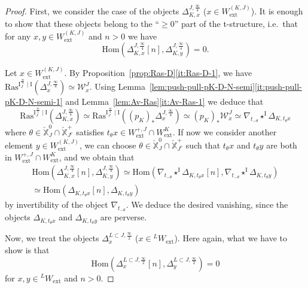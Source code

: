 \documentclass[11pt]{amsart}
\numberwithin{equation}{section}
\theoremstyle{plain}
\theoremstyle{definition}
\newcommand{\I}{{\mathrm I}}
\newcommand{\sW}{{\mathcal W}}
\newcommand{\X}{{\mathbb X}}
\newcommand{\Xd}{\check{\X}}
\newcommand{\Hom}{\mathrm{Hom}}
\newcommand{\semi}{{{\frac{\infty}{2}}}}
\newcommand{\quar}{{{\frac{\infty}{4}}}}
\newcommand{\ex}{\mathrm{ext}}
\newcommand{\Ras}{\mathrm{Ras}}
\newcommand{\comp}{\mathrm{c}}
\begin{document}
\begin{proof}
First, we consider the case of the objects $\Delta^{J,\quar}_{K,x}$ ($x \in W_\ex^{(K,J)}$). It is enough to show that these objects belong to the ``$\geq 0$'' part of the t-structure, i.e.~that for any $x,y\in W_\ex^{(K,J)}$ and $n>0$ we have 
\begin{equation*}
\Hom(\Delta^{J,\quar}_{K,x}[n],\Delta^{J,\quar}_{K,y})=0. 
\end{equation*}

Let $x \in W_\ex^{(K,J)}$.
By Proposition~\ref{prop:Ras-D}\eqref{it:Ras-D-1}, we have $\Ras^{\I_{J}^{\quar}\mid \I}(\Delta^{J,\quar}_{x})\simeq \sW^{J}_{x}$. Using Lemma~\ref{lem:push-pull-pK-D-N-semi}\eqref{it:push-pull-pK-D-N-semi-1} and Lemma~\ref{lem:Av-Ras}\eqref{it:Av-Ras-1} we deduce that
\[
\Ras^{\I_{J}^{\quar}\mid \I}(\Delta^{J,\quar}_{K,x})\simeq \Ras^{\I_{J}^{\quar}\mid \I}((p_K)_* \Delta^{J,\quar}_{x}) \simeq (p_K)_* \sW^{J}_{x} \simeq \nabla_{t_{-\theta}} \star^{\I} \Delta_{K,t_\theta x}
\]
where $\theta \in \Xd_J^0 \cap \Xd_{J^\comp}^+$ satisfies $t_\theta x \in W_\ex^{+,J} \cap W_\ex^{K}$. If now we consider another element $y \in W_\ex^{(K,J)}$, we can choose $\theta \in \Xd_J^0 \cap \Xd_{J^\comp}^+$ such that $t_\theta x$ and $t_\theta y$ are both in $W_\ex^{+,J} \cap W_\ex^{K}$, and we obtain that
\begin{multline*}
\Hom(\Delta^{J,\quar}_{K,x}[n],\Delta^{J,\quar}_{K,y}) \simeq \Hom(\nabla_{t_{-\theta}} \star^{\I} \Delta_{K,t_\theta x} [n],\nabla_{t_{-\theta}} \star^{\I} \Delta_{K,t_\theta y}) \\
\simeq \Hom(\Delta_{K,t_\theta x} [n], \Delta_{K,t_\theta y})
\end{multline*}
by invertibility of the object $\nabla_{t_{-\theta}}$. We deduce the desired vanishing, since the objects $\Delta_{K,t_\theta x}$ and $\Delta_{K,t_\theta y}$ are perverse.

Now, we treat the objects $\Delta^{L\subset J,\semi}_{x}$ ($x \in {}^L W_\ex$). Here again, what we have to show is that
\[
\Hom(\Delta^{L \subset J,\semi}_{x}[n],\Delta^{L \subset J,\semi}_{y})=0
\]
for $x,y \in {}^L W_\ex$ and $n>0$.


\end{proof}
\end{document}

